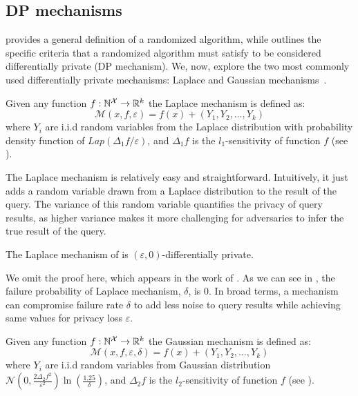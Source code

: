 \subsection{DP mechanisms}\label{subsec:background-dp-mechanism}
 provides a general definition of a randomized algorithm, while  outlines the specific criteria that a randomized algorithm must satisfy to be considered differentially private (\ie DP mechanism).
We, now, explore the two most commonly used differentially private mechanisms: Laplace and Gaussian mechanisms~\cite{dwork2014algorithmic}.
\begin{definition}\label{def:laplace-mechanism}
  Given any function $f: \mathbb{N}^\mathcal{X} \rightarrow \mathbb{R}^k$ the Laplace mechanism is defined as:
  \begin{equation*}
    \mathcal{M}(x, f, \varepsilon) = f(x) + (Y_1, Y_2, \dots, Y_k)
  \end{equation*}
  where $Y_i$ are i.i.d random variables from the Laplace distribution with probability density function of $Lap(\Delta_1 f/\varepsilon)$, and $\Delta_1 f$ is the $l_1$-sensitivity of function $f$ (see ).
\end{definition}
The Laplace mechanism is relatively easy and straightforward. 
Intuitively, it just adds a random variable drawn from a Laplace distribution to the result of the query.
The variance of this random variable quantifies the privacy of query results, as higher variance makes it more challenging for adversaries to infer the true result of the query.
\begin{proposition}
  The Laplace mechanism of  is $(\varepsilon, 0)$-differentially private. 
\end{proposition}
We omit the proof here, which appears in the work of . 
As we can see in , the failure probability of Laplace mechanism, $\delta$, is 0.
In broad terms, a mechanism can compromise failure rate $\delta$ to add less noise to query results while achieving same values for privacy loss $\varepsilon$.
\begin{definition}\label{def:gaussian-mechanism}
  Given any function $f: \mathbb{N}^\mathcal{X} \rightarrow \mathbb{R}^k$ the Gaussian mechanism is defined as:
  \begin{equation*}
    \mathcal{M}(x, f, \varepsilon, \delta) = f(x) + (Y_1, Y_2, \dots, Y_k)
  \end{equation*}
  where $Y_i$ are i.i.d random variables from Gaussian distribution $\mathcal{N}(0, \frac{2\Delta_2 f^2}{\varepsilon^2})\ln(\frac{1.25}{\delta})$, and $\Delta_2 f$ is the $l_2$-sensitivity of function $f$ (see ).
\end{definition}
